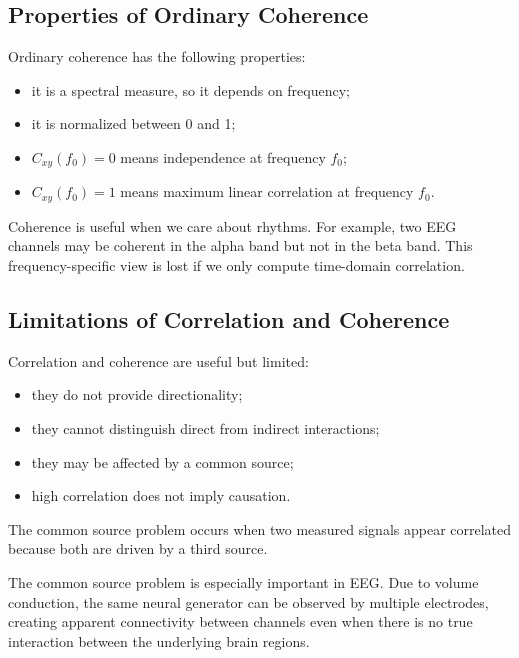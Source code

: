 \subsection{Properties of Ordinary Coherence}

Ordinary coherence has the following properties:

\begin{itemize}[noitemsep]
    \item it is a spectral measure, so it depends on frequency;
    \item it is normalized between 0 and 1;
    \item $C_{xy}(f_0)=0$ means independence at frequency $f_0$;
    \item $C_{xy}(f_0)=1$ means maximum linear correlation at frequency $f_0$.
\end{itemize}

\begin{authornote}
Coherence is useful when we care about rhythms. For example, two EEG channels may be coherent in the alpha band but not in the beta band. This frequency-specific view is lost if we only compute time-domain correlation.
\end{authornote}

\subsection{Limitations of Correlation and Coherence}

Correlation and coherence are useful but limited:

\begin{itemize}[noitemsep]
    \item they do not provide directionality;
    \item they cannot distinguish direct from indirect interactions;
    \item they may be affected by a common source;
    \item high correlation does not imply causation.
\end{itemize}

The common source problem occurs when two measured signals appear correlated because both are driven by a third source.

\begin{authornote}
The common source problem is especially important in EEG. Due to volume conduction, the same neural generator can be observed by multiple electrodes, creating apparent connectivity between channels even when there is no true interaction between the underlying brain regions.
\end{authornote}

